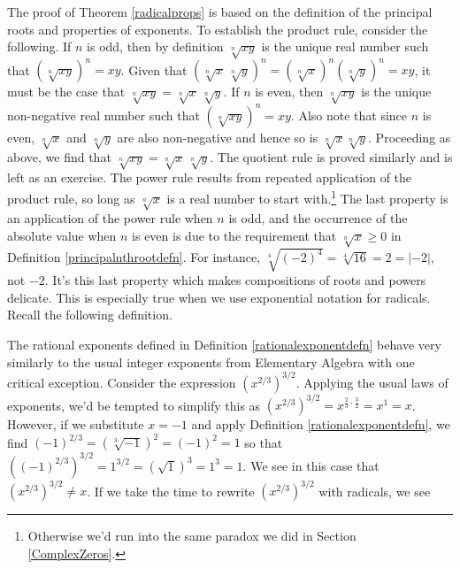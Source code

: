 \medskip

The proof of Theorem \ref{radicalprops} is based on the definition of the principal roots and properties of exponents. To establish the product rule, consider the following.  If $n$ is odd, then by definition $\sqrt[n]{xy}$ is the unique real number such that $(\sqrt[n]{xy})^{n} = xy$.  Given that $\left( \sqrt[n]{x} \, \sqrt[n]{y}\right)^n = \left(\sqrt[n]{x}\right)^n \left(\sqrt[n]{y}\right)^n = xy$, it must be the case that $\sqrt[n]{xy} = \sqrt[n]{x} \, \sqrt[n]{y}$. If $n$ is even, then $\sqrt[n]{xy}$ is the unique non-negative real number such that $(\sqrt[n]{xy})^{n} = xy$.  Also note that since $n$ is even, $\sqrt[n]{x}$ and $\sqrt[n]{y}$ are also non-negative and hence so is $\sqrt[n]{x}\sqrt[n]{y}$.  Proceeding as above, we find that $\sqrt[n]{xy} = \sqrt[n]{x} \, \sqrt[n]{y}$.  The quotient rule is proved similarly and is left as an exercise.  The power rule results from repeated application of the product rule, so long as $\sqrt[n]{x}$ is a real number to start with.\footnote{Otherwise we'd run into the same paradox we did in Section \ref{ComplexZeros}.}  The last property is an application of the power rule when $n$ is odd, and the occurrence of the absolute value when $n$ is even is due to the requirement that  $\sqrt[n]{x} \geq 0$ in Definition \ref{principalnthrootdefn}. For instance, $\sqrt[4]{(-2)^4} = \sqrt[4]{16}= 2 =  |-2|$, not $-2$.   It's this last property which makes compositions of roots and powers delicate.  This is especially true when we use exponential notation for radicals.  Recall the following definition.

\smallskip


\smallskip

The rational exponents defined in Definition \ref{rationalexponentdefn} behave very similarly to the usual integer exponents from Elementary Algebra with one critical exception.  Consider the expression $\left(x^{2/3}\right)^{3/2}$.  Applying the usual laws of exponents, we'd be tempted to simplify this as $\left(x^{2/3}\right)^{3/2} = x^{\frac{2}{3} \cdot \frac{3}{2}} = x^{1} = x$.  However, if we substitute $x=-1$ and apply Definition \ref{rationalexponentdefn}, we find $(-1)^{2/3} = \left(\sqrt[3]{-1}\right)^2 = (-1)^2 = 1$ so that $\left((-1)^{2/3}\right)^{3/2} = 1^{3/2} = \left(\sqrt{1}\right)^3 = 1^3 = 1$.  We see in this case that $\left(x^{2/3}\right)^{3/2} \neq x$.  If we take the time to rewrite $\left(x^{2/3}\right)^{3/2}$ with radicals, we see 

